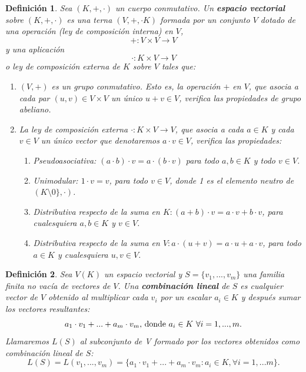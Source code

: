 \documentclass[a4paper,11pt, oneside]{book}
\newtheorem{defi}{Definición}
\begin{document}
\begin{defi}
	Sea $(K, +, \cdot )$ un cuerpo conmutativo. Un \textbf{espacio vectorial} sobre $(K, +, \cdot )$ es una terna $(V, +, \cdot K)$ formada por un conjunto $V$ dotado de una operación (ley de composición interna) en $V$,
	\begin{equation}
	+ : V \times V \rightarrow V
	\end{equation}
	y una aplicación
	\begin{equation}
	\cdot  : K \times V \rightarrow V
	\end{equation}
	o ley de composición externa de $K$ sobre $V$ tales que:
	\begin{enumerate}
	\item $(V, +)$ es un grupo conmutativo. Esto es, la operación $+$ en $V$, que asocia a cada par $(u,v) \in V \times V$ un único $u+v \in V$, verifica las propiedades de grupo abeliano.
	\item La ley de composición externa $\cdot  : K \times V \rightarrow V$, que asocia a cada $a \in K$ y cada $
	v \in V$ un único vector que denotaremos $a \cdot  v \in V$, verifica las propiedades:
	\begin{enumerate}
		\item Pseudoasociativa: $(a \cdot b)\cdot v = a\cdot (b\cdot v)$ para todo $a,b \in K$ y todo $v \in V$.
		\item Unimodular: $1\cdot v = v$, para todo $v \in V$, donde 1 es el elemento neutro de $(K\setminus0\},\cdot )$.
		\item Distributiva respecto de la suma en $K:(a+b)\cdot v=a\cdot v+b\cdot v$, para cualesquiera $a,b \in K$ y $v \in V$.
		\item Distributiva respecto de la suma en $V: a\cdot (u+v) = a\cdot u+a\cdot v$, para todo $a \in K$ y cualesquiera $u,v \in V$.
	\end{enumerate}
	\end{enumerate}
\end{defi}
\begin{defi}
	Sea $V(K)$ un espacio vectorial y $S = \{v_1,...,v_m\}$ una familia finita no vacía de vectores de $V$. Una \textbf{combinación lineal} de $S$ es cualquier vector de $V$ obtenido al multiplicar cada $v_i$ por un escalar $a_i \in K$ y después sumar los vectores resultantes:
	\begin{equation}
	a_1\cdot v_1+...+a_m\cdot v_m\textup{, donde } a_i \in K \textup{ }\forall i = 1,...,m.
	\end{equation}
	Llamaremos $L(S)$ al subconjunto de V formado por los vectores obtenidos como combinación lineal de $S$:
	\begin{equation}
	L(S) = L(v_1,...,v_m) = \{a_1\cdot v_1+...+a_m\cdot v_m : a_i \in K, \forall i = 1,...m\}.
	\end{equation}
\end{defi}
\end{document}
